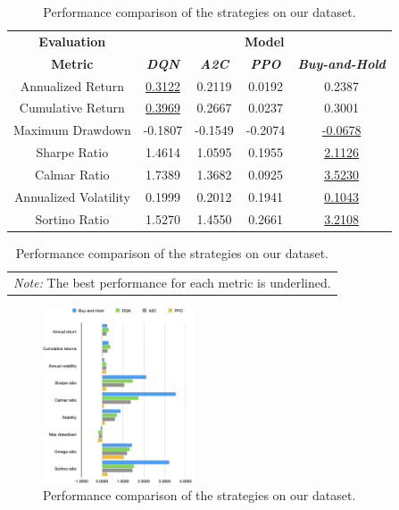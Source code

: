\documentclass[conference]{IEEEtran}
\begin{document}
\begin{table}[htbp]
  \centering
  \caption{Performance comparison of the strategies on our dataset.}
  \begin{tabular}{|c|c|c|c|c|}
    \hline
    \textbf{Evaluation} & \multicolumn{4}{|c|}{\textbf{Model}} \\
    \cline{2-5}
    \textbf{Metric} & \textit{\textbf{DQN}} & \textit{\textbf{A2C}} & \textit{\textbf{PPO}} & \textit{\textbf{Buy-and-Hold}} \\
    \hline
    Annualized Return & \underline{0.3122} & 0.2119 & 0.0192 & 0.2387 \\
    \hline
    Cumulative Return & \underline{0.3969} & 0.2667 & 0.0237 & 0.3001 \\
    \hline
    Maximum Drawdown & -0.1807 & -0.1549 & -0.2074 & \underline{-0.0678} \\
    \hline
    Sharpe Ratio & 1.4614 & 1.0595 & 0.1955 & \underline{2.1126} \\
    \hline
    Calmar Ratio & 1.7389 & 1.3682 & 0.0925 & \underline{3.5230} \\
    \hline
    Annualized Volatility & 0.1999 & 0.2012 & 0.1941 & \underline{0.1043} \\
    \hline
    Sortino Ratio & 1.5270 & 1.4550 & 0.2661 & \underline{3.2108} \\
    \hline
  \end{tabular}
  \begin{tabular}{p{}}
    \textit{Note:} The best performance for each metric is underlined.
  \end{tabular}
  \label{tab:results}
\end{table}

\begin{figure}[htbp]
  \centerline{\includegraphics[width=0.4\textwidth]{figs/results.png}}
  \caption{Performance comparison of the strategies on our dataset.}
  \label{fig:returns}
\end{figure}
\end{document}
